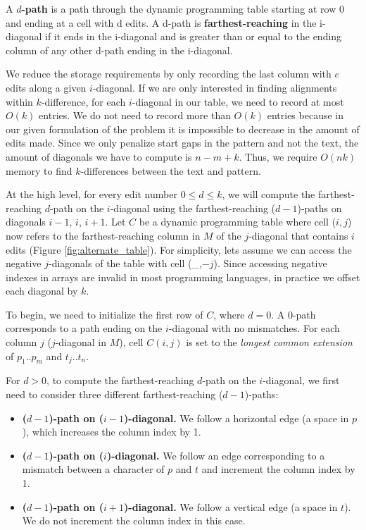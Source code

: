 \begin{definition}
A {\bf $d$-path} is a path through the dynamic programming table starting at row 0 and ending at a cell with d edits.  A d-path is {\bf farthest-reaching} in the i-diagonal if it ends in the i-diagonal and is greater than or equal to the ending column of any other d-path ending in the i-diagonal.
\end{definition}

We reduce the storage requirements by only recording the last column with $e$ edits along a given $i$-diagonal.
If we are only interested in finding alignments within $k$-difference, for each $i$-diagonal in our table, we need to record at most $O(k)$ entries.
We do not need to record more than $O(k)$ entries because in our given formulation of the problem it is impossible to decrease in the amount of edits made.
Since we only penalize start gaps in the pattern and not the text, the amount of diagonals we have to compute is $n - m + k$.
Thus, we require $O(nk)$ memory to find $k$-differences between the text and pattern.

At the high level, for every edit number $0 \leq d \leq k$, we will compute the farthest-reaching $d$-path on the $i$-diagonal using the farthest-reaching ($d-1$)-paths on diagonals $i-1$, $i$, $i+1$.
Let $C$ be a dynamic programming table where cell ($i,j$) now refers to the farthest-reaching column in $M$ of the $j$-diagonal that contains $i$ edits (Figure \ref{fig:alternate_table}).
For simplicity, lets assume we can access the negative $j$-diagonals of the table with cell (\_,$-j$).
Since accessing negative indexes in arrays are invalid in most programming languages, in practice we offset each diagonal by $k$.


To begin, we need to initialize the first row of $C$, where $d=0$.
A $0$-path corresponds to a path ending on the $i$-diagonal with no mismatches.
For each column $j$ ($j$-diagonal in $M$), cell $C(i,j)$ is set to the \emph{longest common extension} of $p_1..p_m$ and $t_j..t_n$.

For $d > 0$, to compute the farthest-reaching $d$-path on the $i$-diagonal, we first need to consider three different farthest-reaching ($d-1$)-paths:

\begin{itemize}
  \item {\bf ($d-1$)-path on ($i-1$)-diagonal.} We follow a horizontal edge (a space in $p$), which increases the column index by 1.
  \item {\bf ($d-1$)-path on ($i$)-diagonal.} We follow an edge corresponding to a mismatch between a character of $p$ and $t$ and increment the column index by 1.
  \item {\bf ($d-1$)-path on ($i+1$)-diagonal.} We follow a vertical edge (a space in $t$).  We do not increment the column index in this case.
\end{itemize}

